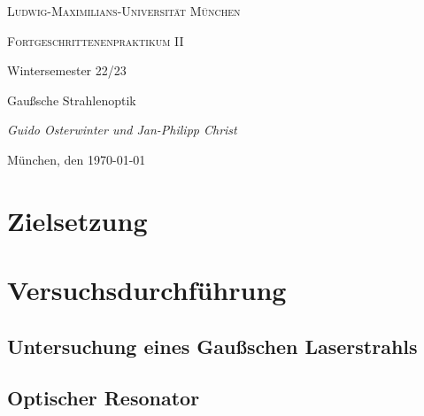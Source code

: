 \documentclass[11pt,a4paper,oneside]{scrartcl}
\begin{document}
\begin{titlepage}
	\centering
	{\scshape\LARGE Ludwig-Maximilians-Universität \linebreak München \par}
	\vspace{1cm}
	{\scshape\Large Fortgeschrittenenpraktikum II \par Wintersemester 22/23 \par}
	\vspace{1.5cm}
	{\huge\bfseries \par  Gaußsche Strahlenoptik\par}
	\vspace{2cm}
	{\Large\itshape Guido Osterwinter und Jan-Philipp Christ \par}
	\vfill
	{\large München, den \today\par}
\end{titlepage}

\tableofcontents
\newpage
\section{Zielsetzung}
\section{Versuchsdurchführung}
\subsection{Untersuchung eines Gaußschen Laserstrahls}
\subsection{Optischer Resonator}
\end{document}
